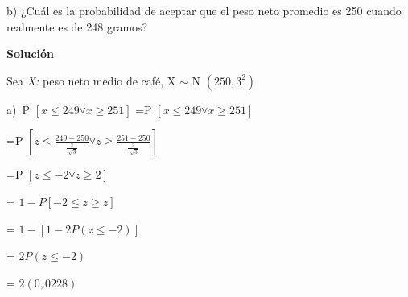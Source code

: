 \documentclass[10pt,a4paper]{article}
\begin{document}
\begin{flushleft}
\begin{justify}
	\begin{justify}
		b) ¿Cuál es la probabilidad de aceptar que el peso neto promedio es 250 cuando realmente es de 248 gramos?
	\end{justify}\par
	
	\begin{justify}
		\textbf{Solución}
	\end{justify}\par
	
	\begin{justify}
		Sea \textit{X:} peso neto medio de café, X $ \sim $  N \(  \left( 250,3^{2} \right)  \)  
	\end{justify}\par
	
	\begin{justify}
		a)\  P \(  \left[ x \leq 249 ˅ x \geq 251 \right]  \) =P \(  \left[ x \leq 249 ˅ x \geq 251 \right]  \) 
	\end{justify}\par
	
	\begin{justify}
		=P \(  \left[ z \leq \frac{249-250}{\frac{3}{\sqrt[]{3}}} ˅ z \geq \frac{251-250}{\frac{3}{\sqrt[]{3}}}  \right]  \) 
	\end{justify}\par
	
	\begin{justify}
		=P \(  \left[ z \leq -2 ˅  z \geq 2 \right]  \) 
	\end{justify}\par
	
	\begin{justify}
		= \( 1-P \left[ -2 \leq z \geq z \right]  \) 
	\end{justify}\par
	
	\begin{justify}
		= \( 1- \left[ 1-2P \left( z \leq -2 \right)  \right]  \) 
	\end{justify}\par
	
	\begin{justify}
		= \( 2P \left( z \leq -2 \right)  \) 
	\end{justify}\par
	
	\begin{justify}
		= \( 2 \left( 0,0228 \right)  \) 
	\end{justify}\par
	

\end{justify}
\end{flushleft}
\end{document}

